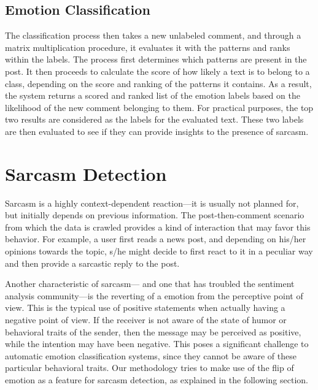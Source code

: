 \documentclass[12pt,a4paper]{report}
\theoremstyle{definition}
\begin{document}
\begin{CJK}{UTF8}{bsmi}
%       
%    
    
    
    \subsection{Emotion Classification}
    \par The classification process then takes a new unlabeled comment, and through a matrix multiplication procedure, it evaluates it with the patterns and ranks within the labels. The process first determines which patterns are present in the post. It then proceeds to calculate the score of how likely a text is to belong to a class, depending on the score and ranking of the patterns it contains. As a result, the system returns a scored and ranked list of the emotion labels based on the likelihood of the new comment belonging to them. For practical purposes, the top two results are considered as the labels for the evaluated text. These two labels are then evaluated to see if they can provide insights to the presence of sarcasm.
\section{Sarcasm Detection}
    \par Sarcasm is a highly context-dependent reaction---it is usually not planned for, but initially depends on previous information. The post-then-comment scenario from which the data is crawled provides a kind of interaction that may favor this behavior. For example, a user first reads a news post, and depending on his/her opinions towards the topic, s/he might decide to first react to it in a peculiar way and then provide a sarcastic reply to the post.
    
    \par Another characteristic of sarcasm— and one that has troubled the sentiment analysis community—is the reverting of a emotion from the perceptive point of view. This is the typical use of positive statements when actually having a negative point of view. If the receiver is not aware of the state of humor or behavioral traits of the sender, then the message may be perceived as positive, while the intention may have been negative. This poses a significant challenge to automatic emotion classification systems, since they cannot be aware of these particular behavioral traits. Our methodology tries to make use of the flip of emotion as a feature for sarcasm detection, as explained in the following section.


\end{CJK}
\end{document}
